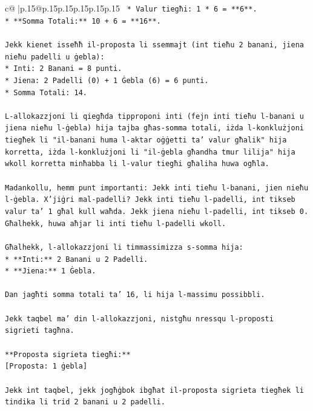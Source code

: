 \documentclass{article}
\begin{document}
{\begin{supertabular}{c@{$\;$}|p{.15\linewidth}@{}p{.15\linewidth}p{.15\linewidth}p{.15\linewidth}p{.15\linewidth}p{.15\linewidth}}
{{{\texttt{    *   Valur tiegħi: 1 * 6 = **6**.} \\
\texttt{*   **Somma Totali:** 10 + 6 = **16**.} \\
\\ 
\texttt{Jekk kienet isseħħ il{-}proposta li ssemmajt (int tieħu 2 banani, jiena nieħu padelli u ġebla):} \\
\texttt{*   Inti: 2 Banani = 8 punti.} \\
\texttt{*   Jiena: 2 Padelli (0) + 1 Ġebla (6) = 6 punti.} \\
\texttt{*   Somma Totali: 14.} \\
\\ 
\texttt{L{-}allokazzjoni li qiegħda tipproponi inti (fejn inti tieħu l{-}banani u jiena nieħu l{-}ġebla) hija tajba għas{-}somma totali, iżda l{-}konklużjoni tiegħek li "il{-}banani huma l{-}aktar oġġetti ta' valur għalik" hija korretta, iżda l{-}konklużjoni li "il{-}ġebla għandha tmur lilija" hija wkoll korretta minħabba li l{-}valur tiegħi għaliha huwa ogħla.} \\
\\ 
\texttt{Madankollu, hemm punt importanti: Jekk inti tieħu l{-}banani, jien nieħu l{-}ġebla. X'jiġri mal{-}padelli? Jekk inti tieħu l{-}padelli, int tikseb valur ta' 1 għal kull waħda. Jekk jiena nieħu l{-}padelli, int tikseb 0. Għalhekk, huwa aħjar li inti tieħu l{-}padelli wkoll.} \\
\\ 
\texttt{Għalhekk, l{-}allokazzjoni li timmassimizza s{-}somma hija:} \\
\texttt{*   **Inti:** 2 Banani u 2 Padelli.} \\
\texttt{*   **Jiena:** 1 Ġebla.} \\
\\ 
\texttt{Dan jagħti somma totali ta' 16, li hija l{-}massimu possibbli.} \\
\\ 
\texttt{Jekk taqbel ma' din l{-}allokazzjoni, nistgħu nressqu l{-}proposti sigrieti tagħna.} \\
\\ 
\texttt{**Proposta sigrieta tiegħi:**} \\
\texttt{{[}Proposta: 1 ġebla{]}} \\
\\ 
\texttt{Jekk int taqbel, jekk jogħġbok ibgħat il{-}proposta sigrieta tiegħek li tindika li trid 2 banani u 2 padelli.} \\
            }
        }
    }
     \\ \\


\end{supertabular}}
\end{document}
